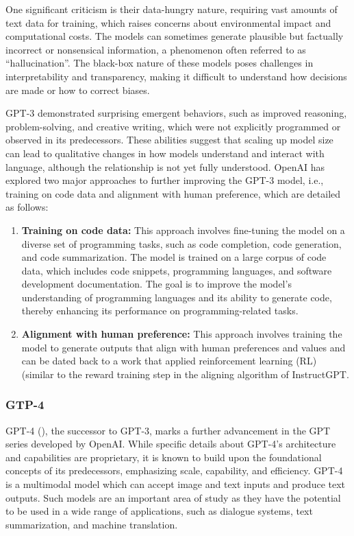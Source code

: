 One significant criticism is their data-hungry nature, requiring vast amounts of text data for training, which raises concerns about environmental impact and computational costs.
The models can sometimes generate plausible but factually incorrect or nonsensical information, a phenomenon often referred to as \enquote{hallucination}.
The black-box nature of these models poses challenges in interpretability and transparency, making it difficult to understand how decisions are made or how to correct biases.

GPT-3 demonstrated surprising emergent behaviors, such as improved reasoning, problem-solving, and creative writing, which were not explicitly programmed or observed in its predecessors.
These abilities suggest that scaling up model size can lead to qualitative changes in how models understand and interact with language, although the relationship is not yet fully understood.
OpenAI has explored two major approaches to further improving the GPT-3 model, i.e., training on code data and alignment with human preference, which are detailed as follows:
\begin{enumerate}
	\item \textbf{Training on code data:} {
		      This approach involves fine-tuning the model on a diverse set of programming tasks, such as code completion, code generation, and code summarization.
		      The model is trained on a large corpus of code data, which includes code snippets, programming languages, and software development documentation.
		      The goal is to improve the model's understanding of programming languages and its ability to generate code, thereby enhancing its performance on programming-related tasks.
	      }
	\item \textbf{Alignment with human preference:} {
	      This approach involves training the model to generate outputs that align with human preferences and values and can be dated back to a work that applied reinforcement learning (RL) \textcite{christiano2017deep} (similar to the reward training step in the aligning algorithm of InstructGPT.
	      }
\end{enumerate}

\subsubsection{GTP-4}
\label{subsubsec:gpt-4}

GPT-4 (\textcite{gpt4}), the successor to GPT-3, marks a further advancement in the GPT series developed by OpenAI. While specific details about GPT-4's architecture and capabilities are proprietary, it is known to build upon the foundational concepts of its predecessors, emphasizing scale, capability, and efficiency.
GPT-4 is a multimodal model which can accept image and text inputs and produce text outputs.
Such models are an important area of study as they have the potential to be used in a wide range of applications, such as dialogue systems, text summarization, and machine translation.

